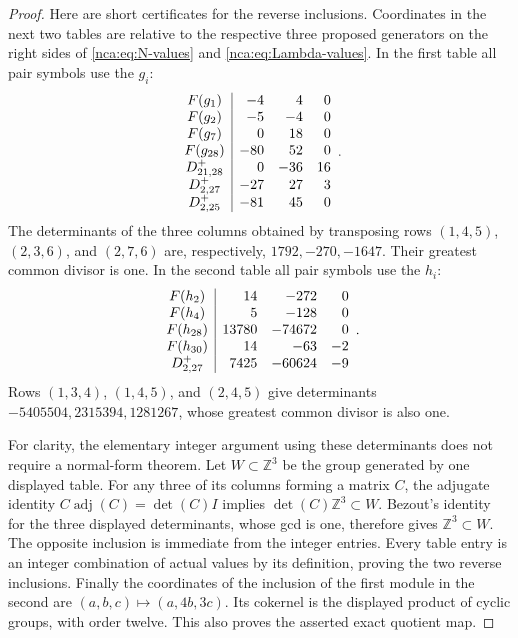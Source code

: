 \begin{proof}
Here are short certificates for the reverse inclusions. Coordinates
in the next two tables are relative to the respective three
proposed generators on the right sides of
\eqref{nca:eq:N-values} and \eqref{nca:eq:Lambda-values}.
In the first table all pair symbols use the \(g_i\):
\begin{equation}
\begin{array}{c|r r r}
 F(g_1)&-4&4&0\\
 F(g_2)&-5&-4&0\\
 F(g_7)&0&18&0\\
 F(g_{28})&-80&52&0\\
 D^+_{21,28}&0&-36&16\\
 D^+_{2,27}&-27&27&3\\
 D^+_{2,25}&-81&45&0
\end{array}.
\label{nca:eq:N-lower-certificate}
\end{equation}
The determinants of the three columns obtained by transposing
rows \((1,4,5)\), \((2,3,6)\), and \((2,7,6)\) are,
respectively, \(1792,-270,-1647\). Their greatest common divisor
is one. In the second table all pair symbols use the \(h_i\):
\begin{equation}
\begin{array}{c|r r r}
 F(h_2)&14&-272&0\\
 F(h_4)&5&-128&0\\
 F(h_{28})&13780&-74672&0\\
 F(h_{30})&14&-63&-2\\
 D^+_{2,27}&7425&-60624&-9
\end{array}.
\label{nca:eq:Lambda-lower-certificate}
\end{equation}
Rows \((1,3,4)\), \((1,4,5)\), and \((2,4,5)\) give
determinants \(-5405504,2315394,1281267\), whose greatest
common divisor is also one.

For clarity, the elementary integer argument using these
determinants does not require a normal-form theorem.  Let
\(W\subset\mathbb Z^3\) be the group generated by one displayed
table.  For any three of its columns forming a matrix \(C\),
the adjugate identity \(C\operatorname{adj}(C)=\det(C)I\)
implies \(\det(C)\mathbb Z^3\subset W\).  Bezout's identity
for the three displayed determinants, whose gcd is one, therefore
gives \(\mathbb Z^3\subset W\). The opposite inclusion is
immediate from the integer entries. Every table entry is an
integer combination of actual values by its definition, proving
the two reverse inclusions.  Finally the coordinates of the
inclusion of the first module in the second are
\((a,b,c)\mapsto(a,4b,3c)\). Its cokernel is the displayed
product of cyclic groups, with order twelve. This also proves
the asserted exact quotient map.
\end{proof}

